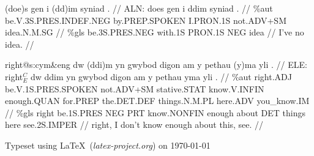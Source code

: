 \documentclass[a4paper,10pt]{article}
\begin{document}
\ex
\begingl[lingstyle=gergl]
\glchat (doe)s gen i (dd)im syniad . //
\glsurface ALN:  does gen i ddim syniad .  //
\glauto \%aut  be{\scriptsize .V.3S.PRES.INDEF.NEG} by{\scriptsize .PREP.SPOKEN} I{\scriptsize .PRON.1S} not{\scriptsize .ADV+SM} idea{\scriptsize .N.M.SG}   //
\glmanual \%gls  be{\scriptsize .3S.PRES.NEG} with{\scriptsize .1S} PRON{\scriptsize .1S} NEG idea   //
\gleng I've no idea. //
\endgl
\xe

\ex
\begingl[lingstyle=gergl]
\glchat right@s:cym\&eng dw (ddi)m yn gwybod digon am y pethau (y)ma yli . //
\glsurface ELE:  right$^{C}_{E}$ dw ddim yn gwybod digon am y pethau yma yli .  //
\glauto \%aut  right{\scriptsize .ADJ} be{\scriptsize .V.1S.PRES.SPOKEN} not{\scriptsize .ADV+SM} stative{\scriptsize .STAT} know{\scriptsize .V.INFIN} enough{\scriptsize .QUAN} for{\scriptsize .PREP} the{\scriptsize .DET.DEF} things{\scriptsize .N.M.PL} here{\scriptsize .ADV} you\_know{\scriptsize .IM}   //
\glmanual \%gls  right be{\scriptsize .1S.PRES} NEG PRT know{\scriptsize .NONFIN} enough about DET things here see{\scriptsize .2S.IMPER}   //
\gleng right, I don't know enough about this, see. //
\endgl
\xe


\vfill

\begin{flushright}
Typeset using \LaTeX\ (\textit{latex-project.org}) on \longdate\today
\end{flushright}
\end{document}
